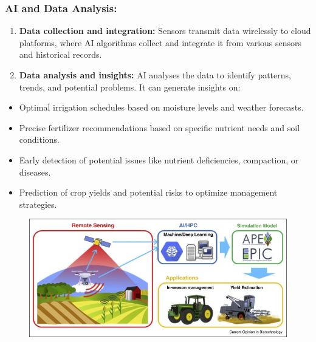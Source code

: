 \documentclass{article}
\begin{document}
\subsubsection{AI and Data Analysis: }
\begin{enumerate}
\item \textbf{Data collection and integration:} Sensors transmit data wirelessly to cloud platforms, where AI algorithms collect and integrate it from various sensors and historical records.
\item\textbf{ Data analysis and insights:} AI analyses the data to identify patterns, trends, and potential problems. It 
can generate insights on: 
\end{enumerate}
\begin{itemize}
  \item Optimal irrigation schedules based on moisture levels and weather forecasts.
  \item Precise fertilizer recommendations based on specific nutrient needs and soil conditions.
  \item Early detection of potential issues like nutrient deficiencies, compaction, or diseases.
  \item Prediction of crop yields and potential risks to optimize management strategies.
\end{itemize}
\begin{figure}[th]
    \centering
    \includegraphics[width=12cm]{1-s2.0-S0958166920301257-gr3.jpg}
     \label{fig:enter-label}
\end{figure}
\end{document}
